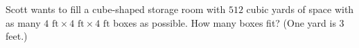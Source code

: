 Scott wants to fill a cube-shaped storage room with $512$ cubic yards of space with as many $4\text{ ft}\times4\text{ ft}\times4\text{ ft}$ boxes as possible. How many boxes fit? (One yard is $3$ feet.)
